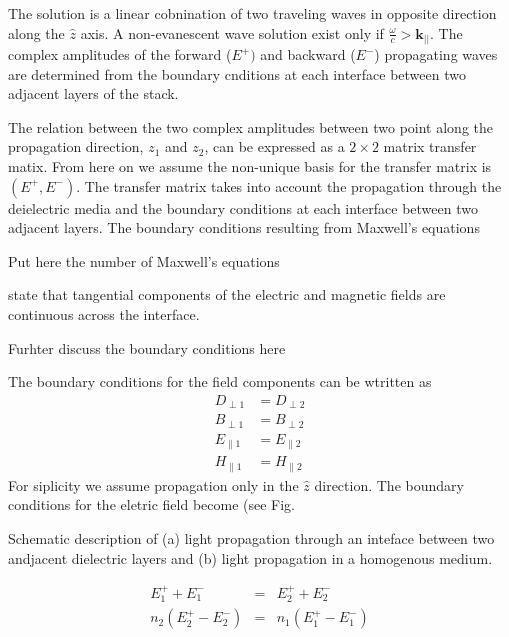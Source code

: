 The solution is a linear cobnination of two traveling waves in opposite
direction along the $\hat{z}$ axis. A non-evanescent wave solution
exist only if $\frac{\omega}{c}>\mathbf{k}_{||}$. The complex amplitudes
of the forward ($E^{+})$ and backward ($E^{-}$) propagating waves
are determined from the boundary cnditions at each interface between
two adjacent layers of the stack.

The relation between the two complex amplitudes between two point
along the propagation direction, $z_{1}$ and $z_{2}$, can be expressed
as a $2\times2$ matrix transfer matix. From here on we assume the
non-unique basis for the transfer matrix is $(E^{+},E^{-})$. The
transfer matrix takes into account the propagation through the deielectric
media and the boundary conditions at each interface between two adjacent
layers. The boundary conditions resulting from Maxwell's equations
%
\begin{lyxgreyedout}
Put here the number of Maxwell's equations 
\end{lyxgreyedout}
 state that tangential components of the electric and magnetic fields
are continuous across the interface. %
\begin{lyxgreyedout}
Furhter discuss the boundary conditions here
\end{lyxgreyedout}
 The boundary conditions for the field components can be wtritten
as\begin{align}
D_{\perp1} & =D_{\perp2}\nonumber \\
B_{\perp1} & =B_{\perp2}\nonumber \\
E_{\parallel1} & =E_{\parallel2}\label{eq:field_boundary_conditions}\\
H_{\parallel1} & =H_{\parallel2}\nonumber \end{align}
For siplicity we assume propagation only in the $\hat{z}$ direction.
The boundary conditions for the eletric field become (see Fig. %
\begin{lyxgreyedout}
Schematic description of (a) light propagation through an inteface
between two andjacent dielectric layers and (b) light propagation
in a homogenous medium.
\end{lyxgreyedout}
 \begin{eqnarray}
E_{1}^{+}+E_{1}^{-} & = & E_{2}^{+}+E_{2}^{-}\\
n_{2}\left(E_{2}^{+}-E_{2}^{-}\right) & = & n_{1}\left(E_{1}^{+}-E_{1}^{-}\right)\end{eqnarray}



